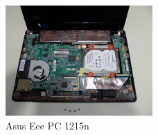 \documentclass[printmode]{mgr}
\begin{document}
\begin{figure}[htbp]
  \centering
    \includegraphics[width=0.5\textwidth]{1215n-front.jpg}
  \caption{Asus Eee PC 1215n}
  \label{fig:devboard-1215n}
\end{figure}






%





\end{document}
